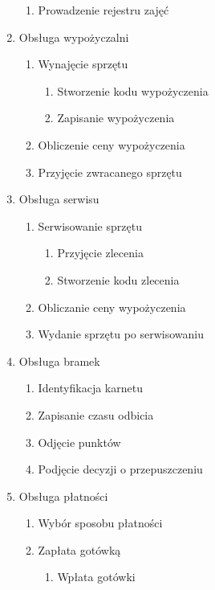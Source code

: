 \begin{multicols}{2}
\begin{enumerate}
\begin{enumerate}
            \item Prowadzenie rejestru zajęć
        \end{enumerate}
    \item Obsługa wypożyczalni
    	\begin{enumerate}
        	\item Wynajęcie sprzętu
            	\begin{enumerate}
                	\item Stworzenie kodu wypożyczenia
                    \item Zapisanie wypożyczenia
                \end{enumerate}
            \item Obliczenie ceny wypożyczenia
            \item Przyjęcie zwracanego sprzętu
    	\end{enumerate}
    \item Obsługa serwisu
    	\begin{enumerate}
        	\item Serwisowanie sprzętu
            	\begin{enumerate}
                	\item Przyjęcie zlecenia
                    \item Stworzenie kodu zlecenia
                \end{enumerate}
            \item Obliczanie ceny wypożyczenia
            \item Wydanie sprzętu po serwisowaniu
        \end{enumerate}
    \item Obsługa bramek
    	\begin{enumerate}
        	\item Identyfikacja karnetu
            \item Zapisanie czasu odbicia
            \item Odjęcie punktów
            \item Podjęcie decyzji o przepuszczeniu
        \end{enumerate}
    \item Obsługa płatności
    	\begin{enumerate}
        	\item Wybór sposobu płatności
            \item Zapłata gotówką
            	\begin{enumerate}
                	\item Wpłata gotówki

\end{enumerate}
\end{enumerate}
\end{enumerate}
\end{multicols}
